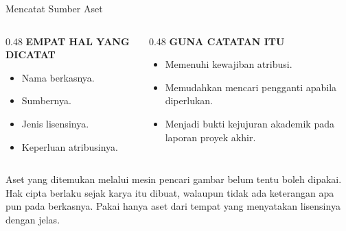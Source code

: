 \documentclass[aspectratio=169,10pt]{beamer}
\begin{document}
\begin{frame}{Mencatat Sumber Aset}
\begin{columns}[T,onlytextwidth]
  \begin{column}{0.48\textwidth}
    {\fontsize{7}{8.5}\selectfont\bfseries\color{ubAccent}EMPAT HAL YANG DICATAT}\par
    \vspace{0.06cm}
    \begin{itemize}
      \item Nama berkasnya.
      \item Sumbernya.
      \item Jenis lisensinya.
      \item Keperluan atribusinya.
    \end{itemize}
  \end{column}
  \begin{column}{0.48\textwidth}
    {\fontsize{7}{8.5}\selectfont\bfseries\color{ubAccent}GUNA CATATAN ITU}\par
    \vspace{0.06cm}
    \begin{itemize}
      \item Memenuhi kewajiban atribusi.
      \item Memudahkan mencari pengganti apabila diperlukan.
      \item Menjadi bukti kejujuran akademik pada laporan proyek akhir.
    \end{itemize}
  \end{column}
\end{columns}
\vspace{0.14cm}
\begin{peringatan}
Aset yang ditemukan melalui mesin pencari gambar belum tentu boleh dipakai.
Hak cipta berlaku sejak karya itu dibuat, walaupun tidak ada keterangan apa pun
pada berkasnya. Pakai hanya aset dari tempat yang menyatakan lisensinya dengan
jelas.
\end{peringatan}
\end{frame}
\end{document}
